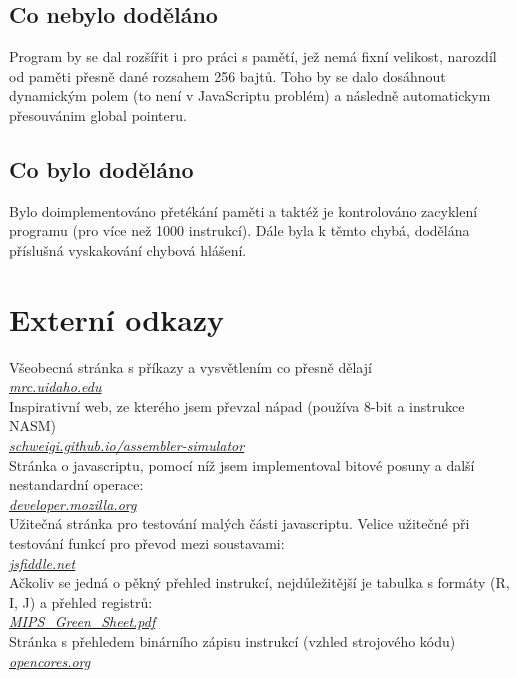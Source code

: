 \documentclass[a4paper,titlepage]{article}
\begin{document}
\subsection{Co nebylo doděláno}
		Program by se dal rozšířit i pro práci s pamětí, jež nemá fixní velikost, narozdíl od paměti přesně dané rozsahem 256 bajtů.
		Toho by se dalo dosáhnout dynamickým polem (to není v JavaScriptu problém) a následně automatickym přesouvánim global pointeru.\\

\subsection{Co bylo doděláno}
		Bylo doimplementováno přetékání paměti a taktéž je kontrolováno zacyklení programu (pro více než 1000 instrukcí). Dále byla k těmto chybá, dodělána příslušná vyskakování chybová hlášení.


\section{Externí odkazy}
	\begin{thebibliography}{99}	
			Všeobecná stránka s příkazy a vysvětlením co přesně dělají\\
			\textit{\href{http://www.mrc.uidaho.edu/mrc/people/jff/digital/MIPSir.html}{mrc.uidaho.edu}}\\
			Inspirativní web, ze kterého jsem převzal nápad (používa 8-bit a instrukce NASM)\\
			\textit{\href{https://schweigi.github.io/assembler-simulator/}{schweigi.github.io/assembler-simulator}}\\
			Stránka o javascriptu, pomocí níž jsem implementoval bitové posuny a další nestandardní operace:\\	
			\textit{\href{https://developer.mozilla.org/cs/docs/Web/JavaScript/Reference/Operators/Bitwise_Operators}{developer.mozilla.org}}\\
			Užitečná stránka pro testování malých části javascriptu. Velice užitečné při testování funkcí pro převod mezi soustavami:\\
			\textit{\href{https://jsfiddle.net/}{jsfiddle.net}}\\
			Ačkoliv se jedná o pěkný přehled instrukcí, nejdůležitější je tabulka s formáty (R, I, J) a přehled registrů:\\	
			\textit{\href{http://www-inst.eecs.berkeley.edu/~cs61c/resources/MIPS_Green_Sheet.pdf}{MIPS\_Green\_Sheet.pdf}}\\	
			Stránka s přehledem binárního zápisu instrukcí (vzhled strojového kódu)\\
			\textit{\href{https://opencores.org/project,plasma,opcodes}{opencores.org}}\\
	
	\end{thebibliography}
\end{document}
